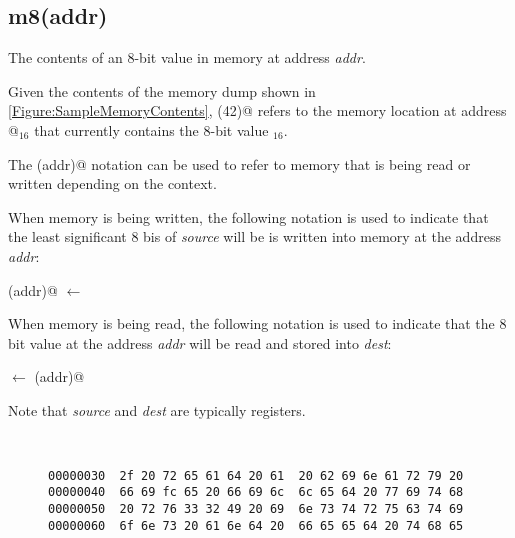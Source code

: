 \begin{figure}[ht]
\centering
{}
\label{Figure:slzrNegative}
\end{figure}


\subsection{m8(addr)}
\label{memory:m8}

The contents of an 8-bit value in memory at address {\em addr}.

Given the contents of the memory dump shown in 
\autoref{Figure:SampleMemoryContents}, 
(42)@ refers to the memory location at address @$_{16}$ 
that currently contains the 8-bit value \verb@fc@$_{16}$.

The \verb@mn(addr)@ notation can be used to refer to memory that is being 
read or written depending on the context.  

When memory is being written, the following notation is used to indicate that 
the least significant 8 bis of {\em source} will be is written into memory at 
the address {\em addr}:

(addr)@ $\leftarrow$ \verb@source@

When memory is being read, the following notation is used to indicate that the 
8 bit value at the address {\em addr} will be read and stored into {\em dest}:

\verb@dest@ $\leftarrow$ (addr)@ 

Note that {\em source} and {\em dest} are typically registers.
 

\begin{figure}[ht]
\centering
\begin{BVerbatim}


00000030  2f 20 72 65 61 64 20 61  20 62 69 6e 61 72 79 20
00000040  66 69 fc 65 20 66 69 6c  6c 65 64 20 77 69 74 68
00000050  20 72 76 33 32 49 20 69  6e 73 74 72 75 63 74 69
00000060  6f 6e 73 20 61 6e 64 20  66 65 65 64 20 74 68 65
\end{BVerbatim}
\label{Figure:SampleMemoryContents}
\end{figure}

